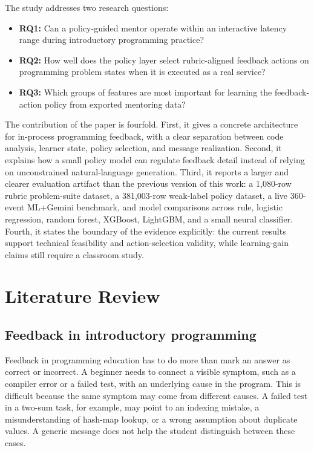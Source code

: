 \documentclass[11pt]{article}
\begin{document}
The study addresses two research questions:

\begin{itemize}
\item \textbf{RQ1:} Can a policy-guided mentor operate within an interactive latency range during introductory programming practice?
\item \textbf{RQ2:} How well does the policy layer select rubric-aligned feedback actions on programming problem states when it is executed as a real service?
\item \textbf{RQ3:} Which groups of features are most important for learning the feedback-action policy from exported mentoring data?
\end{itemize}

The contribution of the paper is fourfold. First, it gives a concrete architecture for in-process programming feedback, with a clear separation between code analysis, learner state, policy selection, and message realization. Second, it explains how a small policy model can regulate feedback detail instead of relying on unconstrained natural-language generation. Third, it reports a larger and clearer evaluation artifact than the previous version of this work: a 1,080-row rubric problem-suite dataset, a 381,003-row weak-label policy dataset, a live 360-event ML+Gemini benchmark, and model comparisons across rule, logistic regression, random forest, XGBoost, LightGBM, and a small neural classifier. Fourth, it states the boundary of the evidence explicitly: the current results support technical feasibility and action-selection validity, while learning-gain claims still require a classroom study.

\section{Literature Review}

\subsection{Feedback in introductory programming}

Feedback in programming education has to do more than mark an answer as correct or incorrect. A beginner needs to connect a visible symptom, such as a compiler error or a failed test, with an underlying cause in the program. This is difficult because the same symptom may come from different causes. A failed test in a two-sum task, for example, may point to an indexing mistake, a misunderstanding of hash-map lookup, or a wrong assumption about duplicate values. A generic message does not help the student distinguish between these cases.
\end{document}
